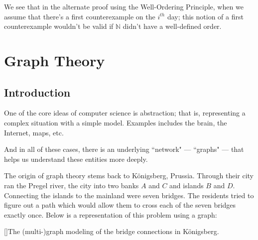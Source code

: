 \documentclass[openany]{book}
\newcommand{\NN}{\mathbb{N}}
\begin{document}
We see that in the alternate proof using the Well-Ordering Principle, when we assume that there's a first counterexample on the $i^{th}$ day; this notion of a first counterexample wouldn't be valid if $\NN$ didn't have a well-defined order.

\chapter{Graph Theory}
\section{Introduction}
One of the core ideas of computer science is abstraction; that is, representing a complex situation with a simple model. Examples includes the brain, the Internet, maps, etc.

And in all of these cases, there is an underlying ``network" --- ``graphs" --- that helps us understand these entities more deeply.

The origin of graph theory stems back to K\"{o}nigsberg, Prussia. Through their city ran the Pregel river, the city into two banks $A$ and $C$ and islands $B$ and $D$. Connecting the islands to the mainland were seven bridges. The residents tried to figure out a path which would allow them to cross each of the seven bridges exactly once. Below is a representation of this problem using a graph:

\begin{center}
\end{center}
[]{The (multi-)graph modeling of the bridge connections in K\"{o}nigsberg.}
\end{document}
